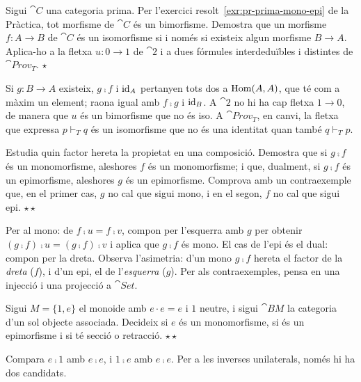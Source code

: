 \begin{exercici}
Sigui $\cat{C}$ una categoria prima. Per l'exercici resolt~\ref{exr:pr-prima-mono-epi} de la Pràctica, tot morfisme de $\cat{C}$ és un bimorfisme. Demostra que un morfisme $f\colon A\to B$ de $\cat{C}$ és un isomorfisme si i només si existeix algun morfisme $B\to A$. Aplica-ho a la fletxa $u\colon 0\to 1$ de $\cat{2}$ i a dues fórmules interdeduïbles i distintes de $\cat{Prov}_T$. \hfill{\normalfont$\star$}
\begin{indicacio}
Si $g\colon B\to A$ existeix, $g\comp f$ i $\operatorname{id}_A$ pertanyen tots dos a $\operatorname{Hom}(A,A)$, que té com a màxim un element; raona igual amb $f\comp g$ i $\operatorname{id}_B$. A $\cat{2}$ no hi ha cap fletxa $1\to 0$, de manera que $u$ és un bimorfisme que no és iso. A $\cat{Prov}_T$, en canvi, la fletxa que expressa $p\vdash_T q$ és un isomorfisme que no és una identitat quan també $q\vdash_T p$.
\end{indicacio}
\end{exercici}

\begin{exercici}
Estudia quin factor hereta la propietat en una composició. Demostra que si $g\comp f$ és un monomorfisme, aleshores $f$ és un monomorfisme; i que, dualment, si $g\comp f$ és un epimorfisme, aleshores $g$ és un epimorfisme. Comprova amb un contraexemple que, en el primer cas, $g$ no cal que sigui mono, i en el segon, $f$ no cal que sigui epi. \hfill{\normalfont$\star\star$}
\begin{indicacio}
Per al mono: de $f\comp u=f\comp v$, compon per l'esquerra amb $g$ per obtenir $(g\comp f)\comp u=(g\comp f)\comp v$ i aplica que $g\comp f$ és mono. El cas de l'epi és el dual: compon per la dreta. Observa l'asimetria: d'un mono $g\comp f$ hereta el factor de la \emph{dreta} ($f$), i d'un epi, el de l'\emph{esquerra} ($g$). Per als contraexemples, pensa en una injecció i una projecció a $\cat{Set}$.
\end{indicacio}
\end{exercici}

\begin{exercici}
Sigui $M=\{1,e\}$ el monoide amb $e\cdot e=e$ i $1$ neutre, i sigui $\cat{B}M$ la categoria d'un sol objecte associada. Decideix si $e$ és un monomorfisme, si és un epimorfisme i si té secció o retracció. \hfill{\normalfont$\star\star$}
\begin{indicacio}
Compara $e\comp 1$ amb $e\comp e$, i $1\comp e$ amb $e\comp e$. Per a les inverses unilaterals, només hi ha dos candidats.
\end{indicacio}
\end{exercici}


